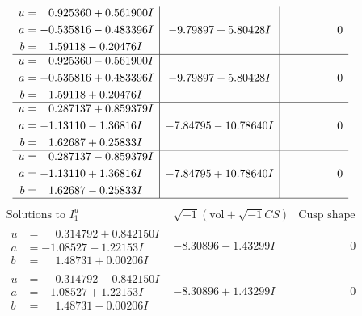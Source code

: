 \documentclass[1p]{elsarticle_modified}
\theoremstyle{definition}
\newcommand{\I}{\sqrt{-1}}
\begin{document}
$$\begin{array}{c|c|c}
\begin{aligned}
u &= \phantom{-}0.925360 + 0.561900 I \\
a &= -0.535816 - 0.483396 I \\
b &= \phantom{-}1.59118 - 0.20476 I\end{aligned}
 & -9.79897 + 5.80428 I & \phantom{-0.000000 } 0 \\ \hline\begin{aligned}
u &= \phantom{-}0.925360 - 0.561900 I \\
a &= -0.535816 + 0.483396 I \\
b &= \phantom{-}1.59118 + 0.20476 I\end{aligned}
 & -9.79897 - 5.80428 I & \phantom{-0.000000 } 0 \\ \hline\begin{aligned}
u &= \phantom{-}0.287137 + 0.859379 I \\
a &= -1.13110 - 1.36816 I \\
b &= \phantom{-}1.62687 + 0.25833 I\end{aligned}
 & -7.84795 - 10.78640 I & \phantom{-0.000000 } 0 \\ \hline\begin{aligned}
u &= \phantom{-}0.287137 - 0.859379 I \\
a &= -1.13110 + 1.36816 I \\
b &= \phantom{-}1.62687 - 0.25833 I\end{aligned}
 & -7.84795 + 10.78640 I & \phantom{-0.000000 } 0\\
 \hline 
 \end{array}$$\newpage$$\begin{array}{c|c|c}  
\text{Solutions to }I^u_{1}& \I (\text{vol} + \sqrt{-1}CS) & \text{Cusp shape}\\
 \hline 
\begin{aligned}
u &= \phantom{-}0.314792 + 0.842150 I \\
a &= -1.08527 - 1.22153 I \\
b &= \phantom{-}1.48731 + 0.00206 I\end{aligned}
 & -8.30896 - 1.43299 I & \phantom{-0.000000 } 0 \\ \hline\begin{aligned}
u &= \phantom{-}0.314792 - 0.842150 I \\
a &= -1.08527 + 1.22153 I \\
b &= \phantom{-}1.48731 - 0.00206 I\end{aligned}
 & -8.30896 + 1.43299 I & \phantom{-0.000000 } 0 \\ \hline\begin{aligned}

\end{aligned}
\end{array}$$
\end{document}
